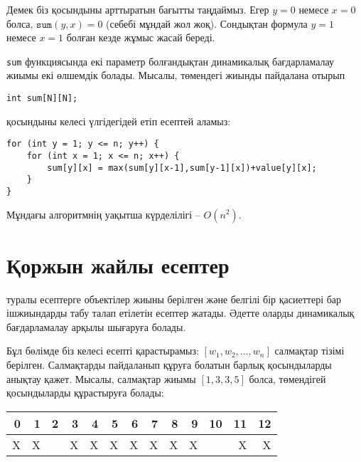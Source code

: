 \begin{center}
\end{center}

Демек біз қосындыны арттыратын бағытты таңдаймыз. 
Егер $y=0$ немесе $x=0$ болса, 
$\texttt{sum}(y,x)=0$ (себебі мұндай жол жоқ).
Сондықтан формула $y=1$ немесе $x=1$ болған кезде жұмыс 
жасай береді. 

\texttt{sum} функциясында екі параметр болғандықтан
динамикалық бағдарламалау жиымы екі өлшемдік болады.
Мысалы, төмендегі жиынды пайдалана отырып
\begin{lstlisting}
int sum[N][N];
\end{lstlisting}
қосындыны келесі үлгідегідей етіп есептей аламыз:
\begin{lstlisting}
for (int y = 1; y <= n; y++) {
    for (int x = 1; x <= n; x++) {
        sum[y][x] = max(sum[y][x-1],sum[y-1][x])+value[y][x];
    }
}
\end{lstlisting}
Мұндағы алгоритмнің уақытша күрделілігі -- $O(n^2)$.

\section{Қоржын жайлы есептер}


 туралы есептерге объектілер жиыны 
берілген және белгілі бір қасиеттері бар 
ішжиындарды табу талап етілетін есептер жатады.
Әдетте оларды динамикалық бағдарламалау арқылы шығаруға болады.

Бұл бөлімде біз келесі есепті қарастырамыз:
$[w_1,w_2,\ldots,w_n]$ салмақтар тізімі берілген.
Салмақтарды пайдаланып құруға 
болатын барлық қосындыларды анықтау қажет. 
Мысалы, салмақтар жиымы $[1,3,3,5]$ болса,
төмендігей қосындыларды құрастыруға болады:

\begin{center}
\begin{tabular}{rrrrrrrrrrrrr}
 0 & 1 & 2 & 3 & 4 & 5 & 6 & 7 & 8 & 9 & 10 & 11 & 12 \\
\hline
 X & X & & X & X & X & X & X & X & X & & X & X \\
\end{tabular}
\end{center}

